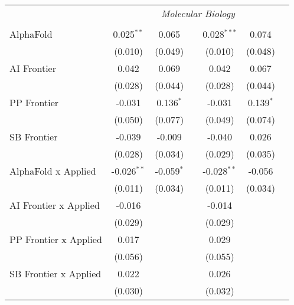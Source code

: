 \begin{tabular}{lcccccc}
 & \multicolumn{6}{c}{\textit{Molecular Biology}} \\ \\
   AlphaFold                    & 0.025$^{**}$  & 0.065        &            & 0.028$^{***}$ & 0.074       &   \\   
                                & (0.010)       & (0.049)      &            & (0.010)       & (0.048)     &   \\   
   AI Frontier                  & 0.042         & 0.069        &            & 0.042         & 0.067       &   \\   
                                & (0.028)       & (0.044)      &            & (0.028)       & (0.044)     &   \\   
   PP Frontier                  & -0.031        & 0.136$^{*}$  &            & -0.031        & 0.139$^{*}$ &   \\   
                                & (0.050)       & (0.077)      &            & (0.049)       & (0.074)     &   \\   
   SB Frontier                  & -0.039        & -0.009       &            & -0.040        & 0.026       &   \\   
                                & (0.028)       & (0.034)      &            & (0.029)       & (0.035)     &   \\   
   AlphaFold x Applied          & -0.026$^{**}$ & -0.059$^{*}$ &            & -0.028$^{**}$ & -0.056      &   \\   
                                & (0.011)       & (0.034)      &            & (0.011)       & (0.034)     &   \\   
   AI Frontier x Applied        & -0.016        &              &            & -0.014        &             &   \\   
                                & (0.029)       &              &            & (0.029)       &             &   \\   
   PP Frontier x Applied        & 0.017         &              &            & 0.029         &             &   \\   
                                & (0.056)       &              &            & (0.055)       &             &   \\   
   SB Frontier x Applied        & 0.022         &              &            & 0.026         &             &   \\   
                                & (0.030)       &              &            & (0.032)       &             &   \\   

\end{tabular}
